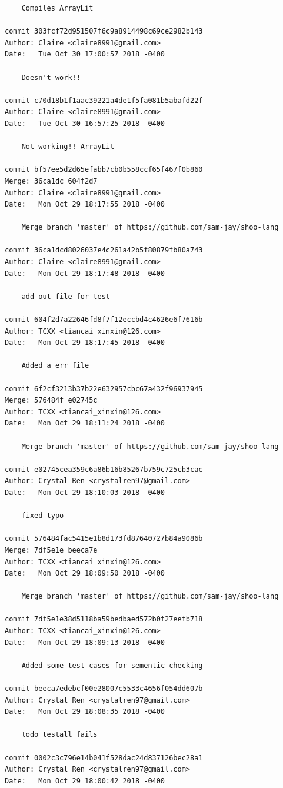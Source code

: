 \documentclass[12pt]{article}
\begin{document}
\begin{lstlisting}
    Compiles ArrayLit

commit 303fcf72d951507f6c9a8914498c69ce2982b143
Author: Claire <claire8991@gmail.com>
Date:   Tue Oct 30 17:00:57 2018 -0400

    Doesn't work!!

commit c70d18b1f1aac39221a4de1f5fa081b5abafd22f
Author: Claire <claire8991@gmail.com>
Date:   Tue Oct 30 16:57:25 2018 -0400

    Not working!! ArrayLit

commit bf57ee5d2d65efabb7cb0b558ccf65f467f0b860
Merge: 36ca1dc 604f2d7
Author: Claire <claire8991@gmail.com>
Date:   Mon Oct 29 18:17:55 2018 -0400

    Merge branch 'master' of https://github.com/sam-jay/shoo-lang

commit 36ca1dcd8026037e4c261a42b5f80879fb80a743
Author: Claire <claire8991@gmail.com>
Date:   Mon Oct 29 18:17:48 2018 -0400

    add out file for test

commit 604f2d7a22646fd8f7f12eccbd4c4626e6f7616b
Author: TCXX <tiancai_xinxin@126.com>
Date:   Mon Oct 29 18:17:45 2018 -0400

    Added a err file

commit 6f2cf3213b37b22e632957cbc67a432f96937945
Merge: 576484f e02745c
Author: TCXX <tiancai_xinxin@126.com>
Date:   Mon Oct 29 18:11:24 2018 -0400

    Merge branch 'master' of https://github.com/sam-jay/shoo-lang

commit e02745cea359c6a86b16b85267b759c725cb3cac
Author: Crystal Ren <crystalren97@gmail.com>
Date:   Mon Oct 29 18:10:03 2018 -0400

    fixed typo

commit 576484fac5415e1b8d173fd87640727b84a9086b
Merge: 7df5e1e beeca7e
Author: TCXX <tiancai_xinxin@126.com>
Date:   Mon Oct 29 18:09:50 2018 -0400

    Merge branch 'master' of https://github.com/sam-jay/shoo-lang

commit 7df5e1e38d5118ba59bedbaed572b0f27eefb718
Author: TCXX <tiancai_xinxin@126.com>
Date:   Mon Oct 29 18:09:13 2018 -0400

    Added some test cases for sementic checking

commit beeca7edebcf00e28007c5533c4656f054dd607b
Author: Crystal Ren <crystalren97@gmail.com>
Date:   Mon Oct 29 18:08:35 2018 -0400

    todo testall fails

commit 0002c3c796e14b041f528dac24d837126bec28a1
Author: Crystal Ren <crystalren97@gmail.com>
Date:   Mon Oct 29 18:00:42 2018 -0400


\end{lstlisting}
\end{document}
